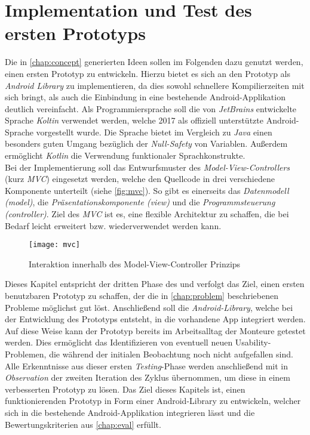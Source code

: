 \chapter{Implementation und Test des ersten Prototyps}

Die in \autoref{chap:concept} generierten Ideen sollen im Folgenden dazu genutzt werden, einen ersten Prototyp zu entwickeln.
Hierzu bietet es sich an den Prototyp als \emph{Android Library} zu implementieren, da dies sowohl schnellere Kompilierzeiten mit sich bringt, als auch die Einbindung in eine bestehende Android-Applikation deutlich vereinfacht.
Als Programmiersprache soll die von \emph{JetBrains} entwickelte Sprache \emph{Koltin} verwendet werden, welche 2017 als offiziell unterstützte Android-Sprache vorgestellt wurde.
Die Sprache bietet im Vergleich zu \emph{Java} einen besonders guten Umgang bezüglich der \emph{Null-Safety} von Variablen.
Außerdem ermöglicht \emph{Kotlin} die Verwendung funktionaler Sprachkonstrukte. \\

Bei der Implementierung soll das Entwurfsmuster des \emph{Model-View-Controllers} (kurz \emph{MVC}) eingesetzt werden, welche den Quellcode in drei verschiedene Komponente unterteilt (siehe \autoref{fig:mvc}). 
So gibt es einerseits das \emph{Datenmodell (model)}, die \emph{Präsentationskomponente (view)} und die \emph{Programmsteuerung (controller)}.
Ziel des \emph{MVC} ist es, eine flexible Architektur zu schaffen, die bei Bedarf leicht erweitert bzw. wiederverwendet werden kann. \\

\begin{figure}[h]
  \centering
  \texttt{[image: mvc]}
  \caption{Interaktion innerhalb des Model-View-Controller Prinzips}
  \label{fig:mvc}
\end{figure}

Dieses Kapitel entspricht der dritten Phase des \hcdp{} und verfolgt das Ziel, einen ersten benutzbaren Prototyp zu schaffen, der die in \autoref{chap:problem} beschriebenen Probleme möglichst gut löst. 
Anschließend soll die \emph{Android-Library}, welche bei der Entwicklung des Prototyps entsteht, in die vorhandene App integriert werden.
Auf diese Weise kann der Prototyp bereits im Arbeitsalltag der Monteure getestet werden.
Dies ermöglicht das Identifizieren von eventuell neuen Usability-Problemen, die während der initialen Beobachtung noch nicht aufgefallen sind. \\

Alle Erkenntnisse aus dieser ersten \emph{Testing}-Phase werden anschließend mit in \emph{Observation} der zweiten Iteration des \hcdp{} Zyklus übernommen, um diese in einem verbesserten Prototyp zu lösen.
Das Ziel dieses Kapitels ist, einen funktionierenden Prototyp in Form einer Android-Library zu entwickeln, welcher sich in die bestehende Android-Applikation integrieren lässt und die Bewertungskriterien aus \autoref{chap:eval} erfüllt.





